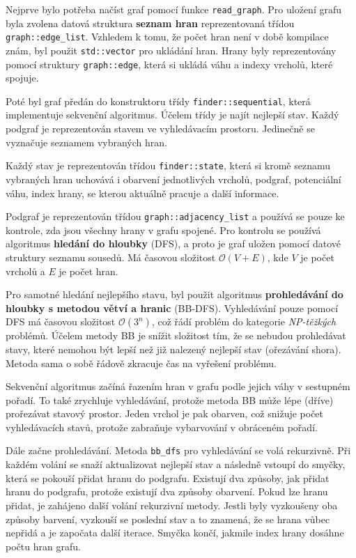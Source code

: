 Nejprve bylo potřeba načíst graf pomocí funkce \texttt{read\_graph}.
Pro uložení grafu byla zvolena datová struktura \textbf{seznam hran} reprezentovaná třídou \texttt{graph::edge\_list}.
Vzhledem k tomu, že počet hran není v době kompilace znám, byl použit \texttt{std::vector} pro ukládání hran.
Hrany byly reprezentovány pomocí struktury \texttt{graph::edge}, která si ukládá váhu a indexy vrcholů, které spojuje.

Poté byl graf předán do konstruktoru třídy \texttt{finder::sequential}, která implementuje sekvenční algoritmus.
Účelem třídy je najít nejlepší stav.
Každý podgraf je reprezentován stavem ve vyhledávacím prostoru.
Jedinečně se vyznačuje seznamem vybraných hran.

Každý stav je reprezentován třídou \texttt{finder::state}, která si kromě seznamu vybraných hran uchovává i obarvení jednotlivých vrcholů, podgraf, potenciální váhu, index hrany, se kterou aktuálně pracuje a další informace.

Podgraf je reprezentován třídou \texttt{graph::adjacency\_list} a používá se pouze ke kontrole, zda jsou všechny hrany v grafu spojené.
Pro kontrolu se používá algoritmus \textbf{hledání do hloubky} (DFS), a proto je graf uložen pomocí datové struktury seznamu sousedů.
Má časovou složitost \(\mathcal{O}(V+E)\), kde \(V\) je počet vrcholů a \(E\) je počet hran.

Pro samotné hledání nejlepšího stavu, byl použit algoritmus \textbf{prohledávání do hloubky s metodou větví a hranic} (BB-DFS).
Vyhledávání pouze pomocí DFS má časovou složitost \(\mathcal{O}(3^n)\), což řádí problém do kategorie \textit{NP-těžkých} problémů.
Účelem metody BB je snížit složitost tím, že se nebudou prohledávat stavy, které nemohou být lepší než již nalezený nejlepší stav (ořezávání shora).
Metoda sama o sobě řádově zkracuje čas na vyřešení problému.

Sekvenční algoritmus začíná řazením hran v grafu podle jejich váhy v sestupném pořadí.
To také zrychluje vyhledávání, protože metoda BB může lépe (dříve) prořezávat stavový prostor.
Jeden vrchol je pak obarven, což snižuje počet vyhledávacích stavů, protože zabraňuje vybarvování v obráceném pořadí.

Dále začne prohledávání.
Metoda \texttt{bb\_dfs} pro vyhledávání se volá rekurzivně.
Při každém volání se snaží aktualizovat nejlepší stav a následně vstoupí do smyčky, která se pokouší přidat hranu do podgrafu.
Existují dva způsoby, jak přidat hranu do podgrafu, protože existují dva způsoby obarvení.
Pokud lze hranu přidat, je zahájeno další volání rekurzivní metody.
Jestli byly vyzkoušeny oba způsoby barvení, vyzkouší se poslední stav a to znamená, že se hrana vůbec nepřidá a je započata další iterace.
Smyčka končí, jakmile index hrany dosáhne počtu hran grafu.

